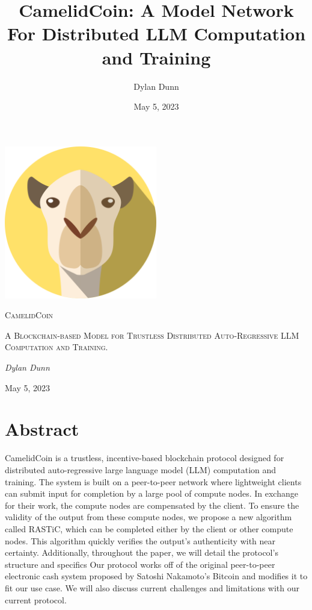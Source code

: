 \documentclass{article}
\title{CamelidCoin: A Model Network For Distributed LLM Computation and Training}
\author{Dylan Dunn}
\date{May 5, 2023}
\begin{document}
\begin{titlepage}
    \centering
    \includegraphics[width=0.5\textwidth]{logoLarge.png}\par\vspace{1cm}
    {\fontsize{40}{48}\selectfont\scshape CamelidCoin\par}
    \vspace{1cm}
    {\scshape\Large A Blockchain-based Model for Trustless Distributed Auto-Regressive LLM Computation and Training. \par}
    \vspace{2cm}
    {\Large\itshape Dylan Dunn\par}
    \vfill
    {\large May 5, 2023\par}
  \end{titlepage}
  

\section{Abstract}
CamelidCoin is a trustless, incentive-based blockchain protocol designed for distributed auto-regressive large language model (LLM) computation and training. 
The system is built on a peer-to-peer network where lightweight clients can submit input for completion by a large pool of compute nodes. 
In exchange for their work, the compute nodes are compensated by the client. 
To ensure the validity of the output from these compute nodes, we propose a new algorithm called RASTiC, which can be completed either by the client or other compute nodes. 
This algorithm quickly verifies the output's authenticity with near certainty. 
Additionally, throughout the paper, we will detail the protocol's structure and specifics
Our protocol works off of the original peer-to-peer electronic cash system proposed by Satoshi Nakamoto's Bitcoin and modifies it to fit our use case. 
We will also discuss current challenges and limitations with our current protocol.
\end{document}
